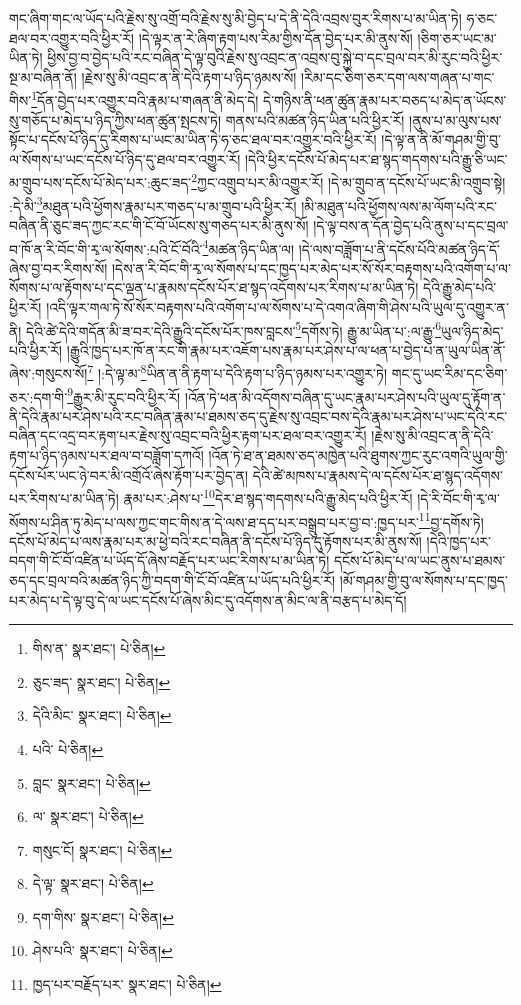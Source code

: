 གང་ཞིག་གང་ལ་ཡོད་པའི་རྗེས་སུ་འགྲོ་བའི་རྗེས་སུ་མི་བྱེད་པ་དེ་ནི་དེའི་འབྲས་བུར་རིགས་པ་མ་ཡིན་ཏེ། ཧ་ཅང་ཐལ་བར་འགྱུར་བའི་ཕྱིར་རོ། །དེ་ལྟར་ན་རེ་ཞིག་རྟག་པས་རིམ་གྱིས་དོན་བྱེད་པར་མི་ནུས་སོ། །ཅིག་ཅར་ཡང་མ་ཡིན་ཏེ། ཕྱིས་བྱ་བ་བྱེད་པའི་རང་བཞིན་དེ་ལྟ་བུའི་རྗེས་སུ་འབྲང་ན་འབྲས་བུ་སྐྱེ་བ་དང་བྲལ་བར་མི་རུང་བའི་ཕྱིར་སྔ་མ་བཞིན་ནོ། །རྗེས་སུ་མི་འབྲང་ན་ནི་དེའི་རྟག་པ་ཉིད་ཉམས་སོ། །རིམ་དང་ཅིག་ཅར་དག་ལས་གཞན་པ་གང་གིས་\footnote{གིས་ན་  སྣར་ཐང་།  པེ་ཅིན། }དོན་བྱེད་པར་འགྱུར་བའི་རྣམ་པ་གཞན་ནི་མེད་དེ། དེ་གཉིས་ནི་ཕན་ཚུན་རྣམ་པར་བཅད་པ་མེད་ན་ཡོངས་སུ་གཅོད་པ་མེད་པ་ཉིད་ཀྱིས་ཕན་ཚུན་སྤངས་ཏེ། གནས་པའི་མཚན་ཉིད་ཡིན་པའི་ཕྱིར་རོ། །ནུས་པ་མ་ལུས་པས་སྟོང་པ་དངོས་པོ་ཉིད་དུ་རིགས་པ་ཡང་མ་ཡིན་ཏེ་ཧ་ཅང་ཐལ་བར་འགྱུར་བའི་ཕྱིར་རོ། །དེ་ལྟ་ན་ནི་མོ་གཤམ་གྱི་བུ་ལ་སོགས་པ་ཡང་དངོས་པོ་ཉིད་དུ་ཐལ་བར་འགྱུར་རོ། །དེའི་ཕྱིར་དངོས་པོ་མེད་པར་ཐ་སྙད་གདགས་པའི་རྒྱུ་ཅི་ཡང་མ་གྲུབ་པས་དངོས་པོ་མེད་པར་:ཆུང་ཟད་\footnote{ཅུང་ཟད་  སྣར་ཐང་།  པེ་ཅིན། }ཀྱང་འགྲུབ་པར་མི་འགྱུར་རོ། །དེ་མ་གྲུབ་ན་དངོས་པོ་ཡང་མི་འགྲུབ་སྟེ། :དེ་མི་\footnote{དེའི་མིང་  སྣར་ཐང་།  པེ་ཅིན། }མཐུན་པའི་ཕྱོགས་རྣམ་པར་གཅད་པ་མ་གྲུབ་པའི་ཕྱིར་རོ། །མི་མཐུན་པའི་ཕྱོགས་ལས་མ་ལོག་པའི་རང་བཞིན་ནི་ཅུང་ཟད་ཀྱང་རང་གི་ངོ་བོ་ཡོངས་སུ་གཅད་པར་མི་ནུས་སོ། །དེ་ལྟ་བས་ན་དོན་བྱེད་པའི་ནུས་པ་དང་བྲལ་བ་ཁོ་ན་རི་བོང་གི་རྭ་ལ་སོགས་:པའི་ངོ་བོའི་\footnote{པའི་  པེ་ཅིན། }མཚན་ཉིད་ཡིན་ལ། །དེ་ལས་བཟློག་པ་ནི་དངོས་པོའི་མཚན་ཉིད་དོ་ཞེས་བྱ་བར་རིགས་སོ། །དེས་ན་རི་བོང་གི་རྭ་ལ་སོགས་པ་དང་ཁྱད་པར་མེད་པར་སོ་སོར་བརྟགས་པའི་འགོག་པ་ལ་སོགས་པ་ལ་རྟོགས་པ་དང་ལྡན་པ་རྣམས་དངོས་པོར་ཐ་སྙད་འདོགས་པར་རིགས་པ་མ་ཡིན་ཏེ། དེའི་རྒྱུ་མེད་པའི་ཕྱིར་རོ། །འདི་ལྟར་གལ་ཏེ་སོ་སོར་བརྟགས་པའི་འགོག་པ་ལ་སོགས་པ་དེ་འགའ་ཞིག་གི་ཤེས་པའི་ཡུལ་དུ་འགྱུར་ན་ནི། དེའི་ཚེ་དེའི་གདོན་མི་ཟ་བར་དེའི་རྒྱུའི་དངོས་པོར་ཁས་བླངས་\footnote{བླང་  སྣར་ཐང་།  པེ་ཅིན། }དགོས་ཏེ། རྒྱུ་མ་ཡིན་པ་:ལ་རྒྱུ་\footnote{ལ་  སྣར་ཐང་།  པེ་ཅིན། }ཡུལ་ཉིད་མེད་པའི་ཕྱིར་རོ། །རྒྱུའི་ཁྱད་པར་ཁོ་ན་རང་གི་རྣམ་པར་འཇོག་པས་རྣམ་པར་ཤེས་པ་ལ་ཕན་པ་བྱེད་པ་ན་ཡུལ་ཡིན་ནོ་ཞེས་:གསུངས་སོ།\footnote{གསུང་ངོ།  སྣར་ཐང་།  པེ་ཅིན། } །:དེ་ལྟ་མ་\footnote{དེ་ལྟ་  སྣར་ཐང་།  པེ་ཅིན། }ཡིན་ན་ནི་རྟག་པ་དེའི་རྟག་པ་ཉིད་ཉམས་པར་འགྱུར་ཏེ། གང་དུ་ཡང་རིམ་དང་ཅིག་ཅར་:དག་གི་\footnote{དག་གིས་  སྣར་ཐང་།  པེ་ཅིན། }རྒྱུར་མི་རུང་བའི་ཕྱིར་རོ། །འོན་ཏེ་ཕན་མི་འདོགས་བཞིན་དུ་ཡང་རྣམ་པར་ཤེས་པའི་ཡུལ་དུ་རྟོག་ན་ནི་དེའི་རྣམ་པར་ཤེས་པའི་རང་བཞིན་རྣམ་པ་ཐམས་ཅད་དུ་རྗེས་སུ་འབྲང་བས་དེའི་རྣམ་པར་ཤེས་པ་ཡང་དེའི་རང་བཞིན་དང་འདྲ་བར་རྟག་པར་རྗེས་སུ་འབྲང་བའི་ཕྱིར་རྟག་པར་ཐལ་བར་འགྱུར་རོ། །རྗེས་སུ་མི་འབྲང་ན་ནི་དེའི་རྟག་པ་ཉིད་ཉམས་པར་ཐལ་བ་བཟློག་དཀའོ། །འོན་ཏེ་ཐ་ན་ཐམས་ཅད་མཁྱེན་པའི་ཐུགས་ཀྱང་རུང་འགའི་ཡུལ་གྱི་དངོས་པོར་ཡང་ཉེ་བར་མི་འགྲོའོ་ཞེས་རྟོག་པར་བྱེད་ན། དེའི་ཚེ་མཁས་པ་རྣམས་དེ་ལ་དངོས་པོར་ཐ་སྙད་འདོགས་པར་རིགས་པ་མ་ཡིན་ཏེ། རྣམ་པར་:ཤེས་པ་\footnote{ཤེས་པའི་  སྣར་ཐང་།  པེ་ཅིན། }དེར་ཐ་སྙད་གདགས་པའི་རྒྱུ་མེད་པའི་ཕྱིར་རོ། །དེ་རི་བོང་གི་རྭ་ལ་སོགས་པ་ཤིན་ཏུ་མེད་པ་ལས་ཀྱང་གང་གིས་ན་དེ་ལས་ཐ་དད་པར་བསྒྲུབ་པར་བྱ་བ་:ཁྱད་པར་\footnote{ཁྱད་པར་བརྗོད་པར་  སྣར་ཐང་།  པེ་ཅིན། }བྱ་དགོས་ཏེ། དངོས་པོ་མེད་པ་ལས་རྣམ་པར་མ་ཕྱེ་བའི་རང་བཞིན་ནི་དངོས་པོ་ཉིད་དུ་རྟོགས་པར་མི་ནུས་སོ། །དེའི་ཁྱད་པར་བདག་གི་ངོ་བོ་འཛིན་པ་ཡོད་དོ་ཞེས་བརྗོད་པར་ཡང་རིགས་པ་མ་ཡིན་ཏེ། དངོས་པོ་མེད་པ་ལ་ཡང་ནུས་པ་ཐམས་ཅད་དང་བྲལ་བའི་མཚན་ཉིད་ཀྱི་བདག་གི་ངོ་བོ་འཛིན་པ་ཡོད་པའི་ཕྱིར་རོ། །མོ་གཤམ་གྱི་བུ་ལ་སོགས་པ་དང་ཁྱད་པར་མེད་པ་དེ་ལྟ་བུ་དེ་ལ་ཡང་དངོས་པོ་ཞེས་མིང་དུ་འདོགས་ན་མིང་ལ་ནི་བརྩད་པ་མེད་དོ། 